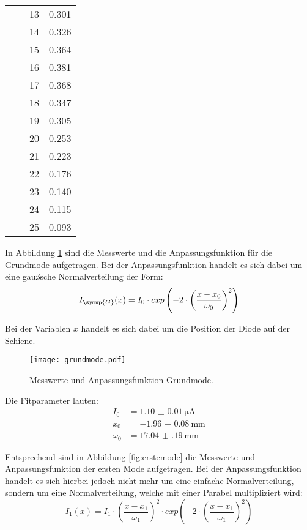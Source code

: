 \begin{table}[H]
\begin{tabular}{S S S S}
       &       &    13  & 0.301 \\
       &       &    14  & 0.326 \\
       &       &    15  & 0.364 \\
       &       &    16  & 0.381 \\
       &       &    17  & 0.368 \\
       &       &    18  & 0.347 \\
       &       &    19  & 0.305 \\
       &       &    20  & 0.253 \\
       &       &    21  & 0.223 \\
       &       &    22  & 0.176 \\
       &       &    23  & 0.140 \\
       &       &    24  & 0.115 \\
       &       &    25  & 0.093 \\
    \bottomrule
  \end{tabular}
\end{table}

In Abbildung \ref{fig:grundmode} sind die Messwerte und die Anpassungsfunktion
für die Grundmode aufgetragen. Bei der Anpassungsfunktion handelt es sich dabei
um eine gaußsche Normalverteilung \cite{sample2} der Form:
\begin{equation*}
  I_\symup{G}(x) = I_0 \cdot exp\left(-2 \cdot \left(\frac{x - x_0}{\omega_0}\right)^2\right)
\end{equation*}

Bei der Variablen $x$ handelt es sich dabei um die Position der Diode auf der Schiene.

\begin{figure}[H]
  \centering
  \texttt{[image: grundmode.pdf]}
  \caption{Messwerte und Anpassungsfunktion Grundmode.}
  \label{fig:grundmode}
\end{figure}

Die Fitparameter lauten:
\begin{align*}
  I_0 &= \SI{1.10(1)}{\micro\ampere} \\
  x_0 &= \SI{-1.96(8)}{\milli\meter} \\
  \omega_0 &= \SI{17.04(19)}{\milli\meter}
\end{align*}

Entsprechend sind in Abbildung \ref{fig:erstemode} die Messwerte und Anpassungsfunktion
der ersten Mode aufgetragen. Bei der Anpassungsfunktion handelt es sich hierbei jedoch
nicht mehr um eine einfache Normalverteilung, sondern um eine Normalverteilung, welche mit einer Parabel multipliziert wird:
\begin{equation*}
  I_{1}(x) = I_1 \cdot \left(\frac{x - x_1}{\omega_1}\right)^2 \cdot exp\left(-2 \cdot \left(\frac{x - x_1}{\omega_1}\right)^2\right)
\end{equation*}

